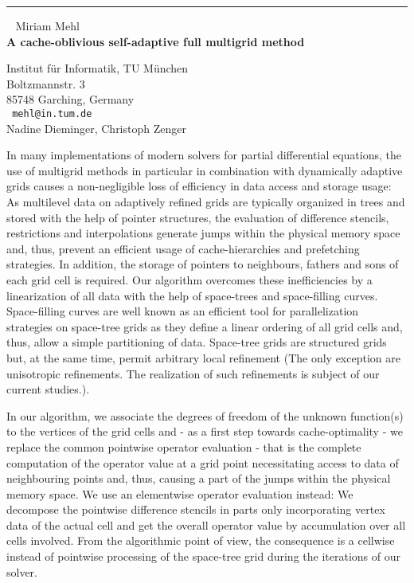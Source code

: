 \documentclass{report}
\begin{document}
\begin{center}

\rule{6in}{1pt} \
{\large
Miriam Mehl
\\ {\bf
A cache-oblivious self-adaptive full multigrid method
}}

Institut f\"{u}r Informatik, TU M\"{u}nchen \\
Boltzmannstr. 3 \\
85748 Garching, Germany
\\ {\tt
mehl@in.tum.de
}
\\
Nadine Dieminger,
Christoph Zenger
\end{center}

In many implementations of modern solvers for partial differential
equations, the use of multigrid methods in particular in combination
with dynamically adaptive grids causes a non-negligible loss of
efficiency in data access and storage usage: As multilevel data on
adaptively refined grids are typically organized in trees and stored
with the help of pointer structures, the evaluation of difference
stencils, restrictions and interpolations generate jumps within the
physical memory space and, thus, prevent an efficient usage of
cache-hierarchies and prefetching strategies. In addition, the storage
of pointers to neighbours, fathers and sons of each grid cell is
required. Our algorithm overcomes these inefficiencies by a
linearization of all data with the help of space-trees and
space-filling curves. Space-filling curves are well known as an
efficient tool for parallelization strategies on space-tree grids as
they define a linear ordering of all grid cells and, thus, allow a
simple partitioning of data. Space-tree grids are structured grids but,
at the same time, permit arbitrary local refinement (The only exception
are unisotropic refinements. The realization of such refinements is
subject of our current studies.).

In our algorithm, we associate the degrees of freedom of the unknown
function(s) to the vertices of the grid cells and - as a first step
towards cache-optimality - we replace the common pointwise operator
evaluation - that is the complete computation of the operator value at
a grid point necessitating access to data of neighbouring points and,
thus, causing a part of the jumps within the physical memory space. We
use an elementwise operator evaluation instead: We decompose the
pointwise difference stencils in parts only incorporating vertex data
of the actual cell and get the overall operator value by accumulation
over all cells involved. From the algorithmic point of view, the
consequence is a cellwise instead of pointwise processing of the
space-tree grid during the iterations of our solver.
\end{document}
